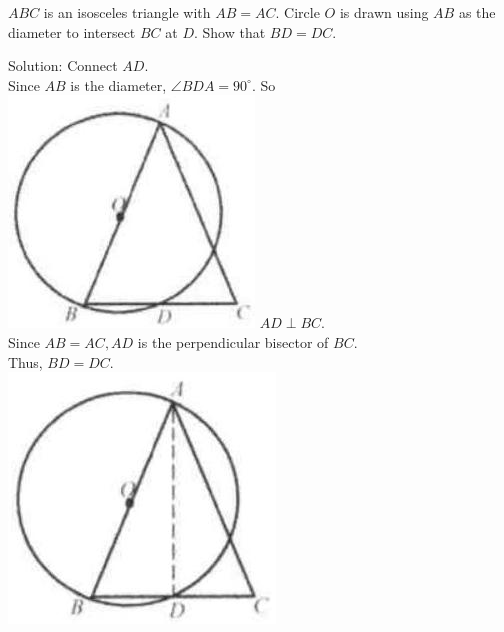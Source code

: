 \documentclass{article}
\begin{document}
\(A B C\) is an isosceles triangle with \(A B=A C\). Circle \(O\) is drawn using \(A B\) as the diameter to intersect \(B C\) at \(D\). Show that \(B D=D C\).

Solution:
Connect \(A D\).\\
Since \(A B\) is the diameter, \(\angle B D A=90^{\circ}\). So\\
\includegraphics[width=\textwidth]{images/163.jpg} \(A D \perp B C\).\\
Since \(A B=A C, A D\) is the perpendicular bisector of \(B C\).\\
Thus, \(B D=D C\).\\
\centering
\includegraphics[width=\textwidth]{images/163(1).jpg}
\end{document}
